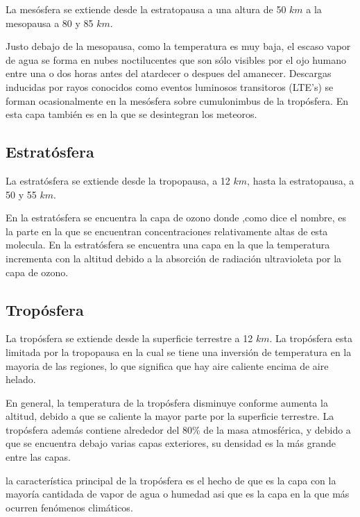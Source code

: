 \documentclass{article} %
\begin{document}
La mesósfera se extiende desde la estratopausa a una altura de 50 $km$ a la mesopausa a 80 y 85 $km$.

Justo debajo de la mesopausa, como la temperatura es muy baja, el escaso vapor de agua se forma en nubes noctilucentes que son sólo visibles por el ojo humano entre una o dos horas antes del atardecer o despues del amanecer. Descargas inducidas por rayos conocidos como eventos luminosos transitoros (LTE's) se forman ocasionalmente en la mesósfera sobre cumulonimbus de la tropósfera. En esta capa también es en la que se desintegran los meteoros.

\newpage

\subsection{Estratósfera}

La estratósfera se extiende desde la tropopausa, a 12 $km$, hasta la estratopausa, a 50 y 55 $km$.

En la estratósfera se encuentra la capa de ozono donde ,como dice el nombre, es la parte en la que se encuentran concentraciones relativamente altas de esta molecula. En la estratósfera se encuentra una capa en la que la temperatura incrementa con la altitud debido a la absorción de radiación ultravioleta por la capa de ozono.

\subsection{Tropósfera}

La tropósfera se extiende desde la superficie terrestre a 12 $km$. La tropósfera esta limitada por la tropopausa en la cual se tiene una inversión de temperatura en la mayoria de las regiones, lo que significa que hay aire caliente encima de aire helado.

En general, la temperatura de la tropósfera disminuye conforme aumenta la altitud, debido a que se caliente la mayor parte por la superficie terrestre. La tropósfera además contiene alrededor del 80\% de la masa atmosférica, y debido a que se encuentra debajo varias capas exteriores, su densidad es la más grande entre las capas.

la característica principal de la tropósfera es el hecho de que es la capa con la mayoría cantidada de vapor de agua o humedad asi que es la capa en la que más ocurren fenómenos climáticos.
\end{document}
